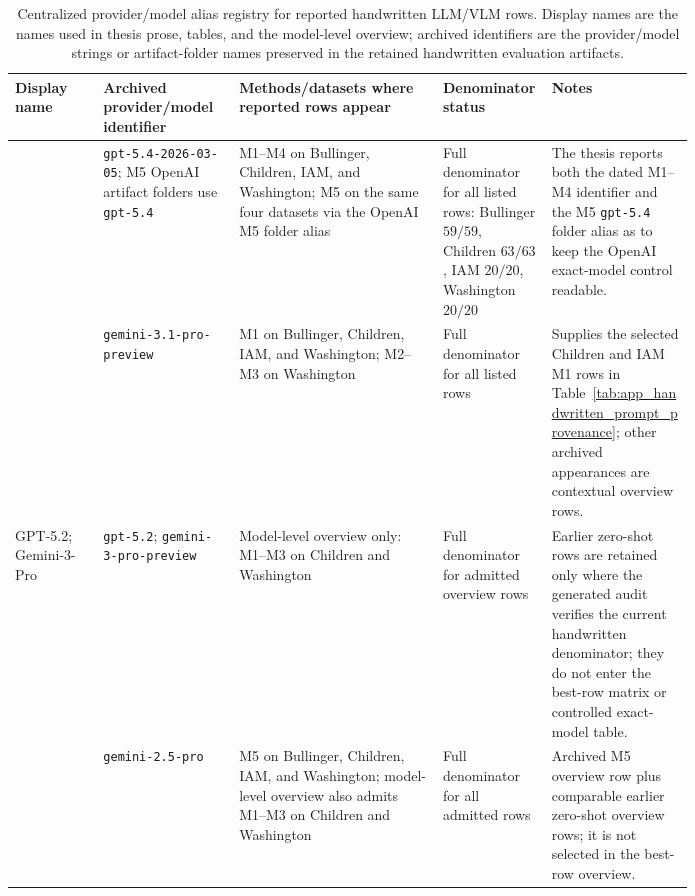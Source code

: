 \begin{landscape}
\begin{table}[p]
  \centering
  \caption{Centralized provider/model alias registry for reported handwritten LLM/VLM rows. Display names are the names used in thesis prose, tables, and the model-level overview; archived identifiers are the provider/model strings or artifact-folder names preserved in the retained handwritten evaluation artifacts.}
  \label{tab:app_model_provider_aliases}
  \scriptsize
  \renewcommand{\arraystretch}{1.08}
  \setlength{\tabcolsep}{4pt}
  \begin{tabularx}{\linewidth}{@{}>{\raggedright\arraybackslash}p{0.13\linewidth}>{\raggedright\arraybackslash}p{0.20\linewidth}>{\raggedright\arraybackslash}p{0.30\linewidth}>{\raggedright\arraybackslash}p{0.16\linewidth}Y@{}}
    \toprule
    \textbf{Display name} & \textbf{Archived provider/model identifier} & \textbf{Methods/datasets where reported rows appear} & \textbf{Denominator status} & \textbf{Notes} \\
    \midrule
    \GPTFiveShort{} & \texttt{gpt-5.4-2026-03-05}; M5 OpenAI artifact folders use \texttt{gpt-5.4} & M1--M4 on Bullinger, Children, IAM, and Washington; M5 \contextHundred{} on the same four datasets via the OpenAI M5 folder alias & Full denominator for all listed rows: Bullinger \(59/59\), Children \(63/63\), IAM \(20/20\), Washington \(20/20\) & The thesis reports both the dated M1--M4 identifier and the M5 \texttt{gpt-5.4} folder alias as \GPTFiveShort{} to keep the OpenAI exact-model control readable. \\
    \GeminiThreeShort{} & \texttt{gemini-3.1-pro-preview} & M1 on Bullinger, Children, IAM, and Washington; M2--M3 on Washington & Full denominator for all listed rows & Supplies the selected Children and IAM M1 rows in Table~\ref{tab:app_handwritten_prompt_provenance}; other archived appearances are contextual overview rows. \\
    GPT-5.2; Gemini-3-Pro & \texttt{gpt-5.2}; \texttt{gemini-3-pro-preview} & Model-level overview only: M1--M3 on Children and Washington & Full denominator for admitted overview rows & Earlier zero-shot rows are retained only where the generated audit verifies the current handwritten denominator; they do not enter the best-row matrix or controlled exact-model table. \\
    \GeminiTwoFiveProShort{} & \texttt{gemini-2.5-pro} & M5 \contextHundred{} on Bullinger, Children, IAM, and Washington; model-level overview also admits M1--M3 on Children and Washington & Full denominator for all admitted rows & Archived M5 overview row plus comparable earlier zero-shot overview rows; it is not selected in the best-row overview. \\

\end{tabularx}
\end{table}
\end{landscape}
